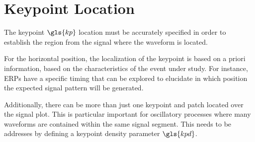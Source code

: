 


\section{Keypoint Location}
\label{keypointlocation}

%


The keypoint $\gls{kp}$ location must be accurately specified in order to establish the region from the signal where the waveform is located.

For the horizontal position, the localization of the keypoint is based on a priori information, based on the characteristics of the event under study.  For instance, ERPs have a specific timing that can be explored to elucidate in which position the expected signal pattern will be generated.

Additionally, there can be more than just one keypoint and patch located over the signal plot.  This is particular important for oscillatory processes where many waveforms are contained within the same signal segment.  This needs to be addresses by defining a keypoint density parameter $\gls{kpd}$.

